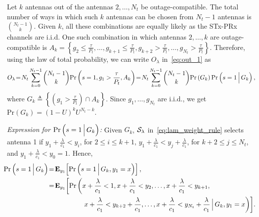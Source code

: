 \documentclass[12pt,draftcls,peerreview,onecolumn]{IEEEtran}
\newcommand{\brac}[1]{\left({#1}\right)}
\newcommand{\define}{\triangleq}
\newcommand{\prob}[1]{\text{Pr}\brac{#1}}
\newcommand{\Given}{\Big\arrowvert}
\newcommand{\nck}[2]{\binom{#1}{#2}}
\newcommand{\setA}{A}
\newcommand{\setAk}{\setA_{k}}
\newcommand{\setG}{G}
\newcommand{\setGk}{\setG_k}
\newcommand{\lam}{\lambda}
\newcommand{\Nt}{{N_t}}
\newcommand{\Pt}{{P_t}}
\newcommand{\puch}{g}
\newcommand{\gk}[1]{{\puch_{#1}}}
\newcommand{\itau}{\tau}
\newcommand{\cone}{c_{1}}
\newcommand{\out}{O}
\newcommand{\m}{\cone}
\newcommand{\taubypt}{\frac{\itau}{\Pt}}
\newcommand{\gkgrtaubypt}[1]{{\gk{#1}}>\taubypt}
\newcommand{\gklttaubypt}[1]{{\gk{#1}}\leq\taubypt}
\newcommand{\lambym}{\frac{\lam}{\m}}
\newcommand{\yk}[1]{y_{#1}}
\newcommand{\ykplambym}[1]{\yk{#1}+\lambym}
\newcommand{\xplambym}{x+\lambym}
\newcommand{\un}{U}
\newcommand{\callamrule}{{\cal S_{{\lam}}}}
\newcommand{\outlam}{\out_{\lam}}
\begin{document}
Let $k$ antennas out of the antennas $2,\ldots,\Nt$ be outage-compatible. The total number of ways in which such $k$ antennas can be chosen from $\Nt-1$ antennas is $\nck{\Nt-1}{k}$. Given $k$, all these combinations are equally likely as the STx-PRx channels are i.i.d. One such combination in which antennas $2,\ldots,k$ are outage-compatible is $\setAk=\left\{\gklttaubypt{2},\dots,\gklttaubypt{k+1}, \gkgrtaubypt{k+2},\dots,\gkgrtaubypt{\Nt}\right\}$. Therefore, using the law of total probability, we can write $\outlam$ in~\eqref{eq:out_1} as
%
\begin{equation}
\outlam \!=\!\Nt\sum_{k=0}^{\Nt-1}\nck{\Nt-1}{k} \text{Pr}\brac{s = 1,\gk{1}>\taubypt,\setAk} \!=\!\Nt\sum_{k=0}^{\Nt-1}\nck{\Nt-1}{k}  \text{Pr}\brac{\setGk} \text{Pr}\brac{s = 1\Given \setGk},
\label{eq:out_3}
\end{equation}
%
where $\setGk\define\left\{\left(\gkgrtaubypt{1}\right)\cap\setAk \right\}$. Since $\gk{1},\ldots,\gk{\Nt}$ are i.i.d., we get $\prob{\setGk} = \left(1-\un\right)^k\un^{\Nt-k}$.
%

{\em Expression for $\prob{s = 1\Given\setGk}$:} Given $\setGk$, $\callamrule$ in~\eqref{eq:lam_weight_rule} selects antenna 1 if $\ykplambym{1}<\yk{i}$, for $2\leq i \leq k+1$,  $\ykplambym{1}<\ykplambym{j}$, for $k+2\leq j \leq \Nt$, and $\ykplambym{1}<\yk{0}=1$. Hence,
%
\begin{align}
\label{eq:out_5}
\!\!\!\prob{s = 1\Given \setGk }&\!=\!{\bf{E}}_{\yk{1}}\!\left[\prob{s = 1\Given\setGk,\yk{1}=x}\right] ,\\
\label{eq:out_51}
&\!=\!{\bf{E}}_{\yk{1}}\!\left[\text{Pr}\left(\xplambym < 1, \xplambym<\yk{2}, \dots ,\xplambym<\yk{k+1},\right.\right.\nonumber\\
&\quad\quad\quad\quad\quad\left.\left.
\xplambym<\ykplambym{k+2}, \dots ,\xplambym < \ykplambym{\Nt}\Given\setGk,\yk{1}=x\right)\right]\!.
\end{align} 
%
\end{document}
